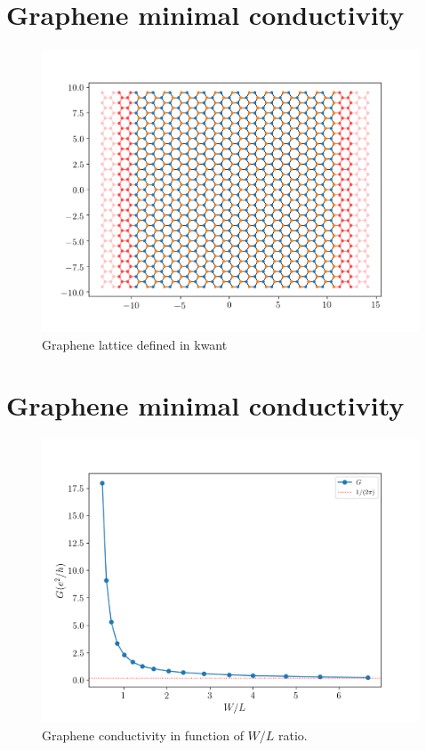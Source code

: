 \documentclass[12pt]{article}
\numberwithin{equation}{section}
\begin{document}
\newpage
\section*{Graphene minimal conductivity}
\begin{figure}[h!]
    \begin{center}
        \includegraphics[height=0.7\textheight]{./media/graphene_layer_W=20L=20.png}
        \caption{Graphene lattice defined in kwant}
        \label{fig:graphene_layer_W=20L=20.png}
    \end{center}
\end{figure}

\newpage
\section*{Graphene minimal conductivity}
\begin{figure}[h!]
    \begin{center}
        \includegraphics[height=0.7\textheight]{./media/graphene_conductivity_WL.png}
        \caption{Graphene conductivity in function of $W/L$ ratio.}
        \label{fig:graphene_conductivity_WL.png}
    \end{center}
\end{figure}
\end{document}
